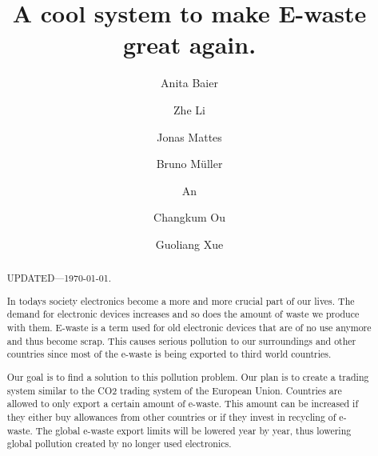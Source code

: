 \documentclass[sigchi-a, authorversion]{acmart}
\begin{document}
\title{A cool system to make E-waste great again.}

\author{Anita Baier}

\author{Zhe Li}

\author{Jonas Mattes}

\author{Bruno M\"uller}

\author{An}

\author{Changkum Ou}

\author{Guoliang Xue}



\begin{abstract}
  UPDATED---\today.
  
  In todays society electronics become a more and more crucial part of our lives. 
  The demand for electronic devices increases and so does the amount of waste we produce with them. 
  E-waste is a term used for old electronic devices that are of no use anymore and thus become scrap. 
  This causes serious pollution to our surroundings and other countries since most of the e-waste is 
  being exported to third world countries.
  
  Our goal is to find a solution to this pollution problem. Our plan is to create a trading system similar 
  to the CO2 trading system of the European Union. Countries are allowed to only export a certain amount of e-waste. 
  This amount can be increased if they either buy allowances from other countries or if they invest in recycling of e-waste. 
  The global e-waste export limits will be lowered year by year, thus lowering global pollution created by no longer
  used electronics.  
  
\end{abstract}
\end{document}
